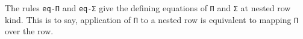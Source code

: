 \documentclass[authoryear, acmsmall, screen, review, nonacm]{acmart} %
\begin{document}
\Ni The rules \verb!eq-Π! and \verb!eq-Σ! give the defining equations of \verb!Π! and \verb!Σ! at nested row kind. This is to say, application of \verb!Π! to a nested row is equivalent to mapping \verb!Π! over the row. 
\begin{code} %
%
\>[4]%
\>[2428I]\AgdaSymbol{:}\AgdaSpace{}%
\AgdaSpace{}%
\AgdaSymbol{\{}\AgdaSpace{}%
\AgdaSymbol{:}\AgdaSpace{}%
\AgdaSpace{}%
\AgdaSpace{}%
\AgdaOperator{\AgdaInductiveConstructor{R[}}\AgdaSpace{}%
\AgdaOperator{\AgdaInductiveConstructor{R[}}\AgdaSpace{}%
\AgdaSpace{}%
\AgdaOperator{\AgdaInductiveConstructor{]}}\AgdaSpace{}%
\AgdaOperator{\AgdaInductiveConstructor{]}}\AgdaSymbol{\}}\AgdaSpace{}%
\AgdaSymbol{\{}\AgdaSpace{}%
\AgdaSymbol{:}\AgdaSpace{}%
\AgdaSpace{}%
\AgdaSymbol{(}\AgdaSpace{}%
\AgdaSymbol{)\}}\AgdaSpace{}%
\<%
\\
\>[.][@{}l@{}]\<[2428I]%
\>[9]\AgdaSpace{}%
\AgdaSymbol{\{}\AgdaSpace{}%
\AgdaSymbol{=}\AgdaSpace{}%
\AgdaSymbol{\}}\AgdaSpace{}%
\AgdaSpace{}%
\AgdaSpace{}%
\AgdaSpace{}%
\AgdaSpace{}%
\AgdaSymbol{\{}\AgdaSpace{}%
\AgdaSymbol{=}\AgdaSpace{}%
\AgdaSymbol{\}}\AgdaSpace{}%
\AgdaOperator{\AgdaInductiveConstructor{<\$>}}\AgdaSpace{}%
\<%
\\
%
\>[4]%
\>[2457I]\AgdaSymbol{:}\AgdaSpace{}%
\AgdaSpace{}%
\AgdaSymbol{\{}\AgdaSpace{}%
\AgdaSymbol{:}\AgdaSpace{}%
\AgdaSpace{}%
\AgdaSpace{}%
\AgdaOperator{\AgdaInductiveConstructor{R[}}\AgdaSpace{}%
\AgdaOperator{\AgdaInductiveConstructor{R[}}\AgdaSpace{}%
\AgdaSpace{}%
\AgdaOperator{\AgdaInductiveConstructor{]}}\AgdaSpace{}%
\AgdaOperator{\AgdaInductiveConstructor{]}}\AgdaSymbol{\}}\AgdaSpace{}%
\AgdaSymbol{\{}\AgdaSpace{}%
\AgdaSymbol{:}\AgdaSpace{}%
\AgdaSpace{}%
\AgdaSymbol{(}\AgdaSpace{}%
\AgdaSymbol{)\}}\AgdaSpace{}%
\<%
\\
\>[.][@{}l@{}]\<[2457I]%
\>[9]\AgdaSpace{}%
\AgdaSymbol{\{}\AgdaSpace{}%
\AgdaSymbol{=}\AgdaSpace{}%
\AgdaSymbol{\}}\AgdaSpace{}%
\AgdaSpace{}%
\AgdaSpace{}%
\AgdaSpace{}%
\AgdaSpace{}%
\AgdaSymbol{\{}\AgdaSpace{}%
\AgdaSymbol{=}\AgdaSpace{}%
\AgdaSymbol{\}}\AgdaSpace{}%
\AgdaOperator{\AgdaInductiveConstructor{<\$>}}\AgdaSpace{}%
\<%
\end{code}
\end{document}
